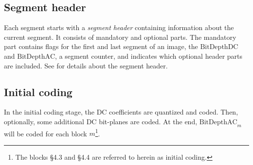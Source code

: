 \subsection{Segment header}
Each segment starts with a \textit{segment header} containing information about the current segment. It consists of mandatory and optional parts. The mandatory part contains flags for the first and last segment of an image, the $\mathrm{BitDepthDC}$ and $\mathrm{BitDepthAC}$, a segment counter, and indicates which optional header parts are included. See \cite[pp.~4-5ff]{CCSDS122blue} for details about the segment header.

\subsection{Initial coding}\label{sec:fundamentals:ccsds_initial_coding}
In the initial coding stage, the DC coefficients are quantized and coded. Then, optionally, some additional DC bit-planes are coded. At the end, $\mathrm{BitDepthAC}_m$ will be coded for each block $m$\footnote{The blocks {\S}4.3 and {\S}4.4 are referred to herein as initial coding.}.\\

